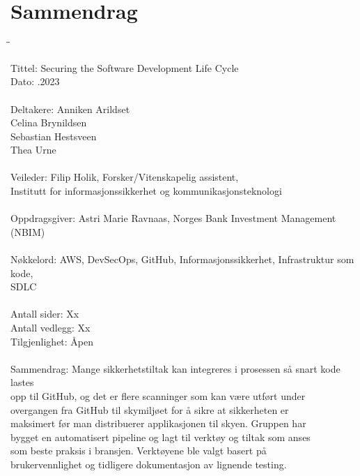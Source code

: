 \chapter*{Sammendrag}
{ %
\begin{tabbing}
\hspace{2cm}\=\hspace{1.5cm}\=\kill %

Tittel: \> \> Securing the Software Development Life Cycle \\
Dato: \> .2023 \\ 
\\
Deltakere: \> \> Anniken Arildset \\ \> \> Celina Brynildsen \\ \> \> Sebastian Hestsveen \\ \> \> Thea Urne \\
\\
Veileder: \> \> Filip Holik, Forsker/Vitenskapelig assistent, \\\> \> Institutt for informasjonssikkerhet og kommunikasjonsteknologi \\
\\
Oppdragsgiver: \> \>  Astri Marie Ravnaas, Norges Bank Investment Management (NBIM) \\
\\
Nøkkelord: \> \> AWS, DevSecOps, GitHub, Informasjonssikkerhet, Infrastruktur som kode,\\\> \> SDLC \\
\\
Antall sider: \> \> Xx \\
Antall vedlegg: \> \> Xx \\
Tilgjenlighet: \> \> Åpen \\
\\
Sammendrag: \> \>Mange sikkerhetstiltak kan integreres i prosessen så snart kode lastes \\\> \>opp til GitHub, og det er flere scanninger som kan være utført under \\\> \>overgangen fra GitHub til skymiljøet for å sikre at sikkerheten er \\\> \>maksimert før man distribuerer applikasjonen til skyen. Gruppen har \\\> \>bygget en automatisert pipeline og lagt til verktøy og tiltak som anses\\\> \> som beste praksis i bransjen. Verktøyene ble valgt basert på\\\> \> brukervennlighet og tidligere dokumentasjon av lignende testing.
\end{tabbing}
}



